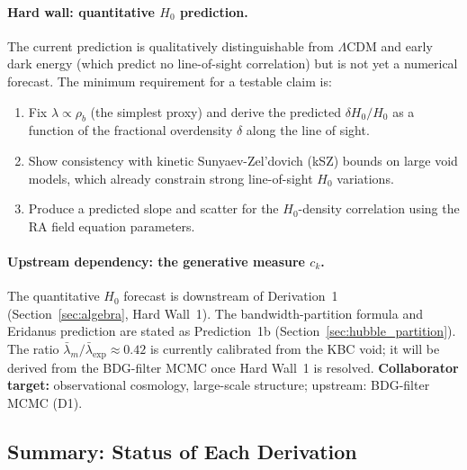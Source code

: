\documentclass[11pt,a4paper]{article}
\theoremstyle{plain}
\theoremstyle{definition}
\theoremstyle{remark}
\begin{document}
\paragraph{Hard wall: quantitative $H_0$ prediction.}
The current prediction is qualitatively distinguishable from $\Lambda$CDM and
early dark energy (which predict no line-of-sight correlation) but is not yet
a numerical forecast. The minimum requirement for a testable claim is:
\begin{enumerate}[noitemsep]
  \item Fix $\lambda \propto \rho_b$ (the simplest proxy) and derive the
  predicted $\delta H_0 / H_0$ as a function of the fractional overdensity
  $\delta$ along the line of sight.
  \item Show consistency with kinetic Sunyaev-Zel'dovich (kSZ) bounds on large
  void models, which already constrain strong line-of-sight $H_0$ variations.
  \item Produce a predicted slope and scatter for the $H_0$-density correlation
  using the RA field equation parameters.
\end{enumerate}

\paragraph{Upstream dependency: the generative measure $c_k$.}
The quantitative $H_0$ forecast is downstream of Derivation~1
(Section~\ref{sec:algebra}, Hard Wall~1). The bandwidth-partition formula
and Eridanus prediction are stated as Prediction~1b
(Section~\ref{sec:hubble_partition}). The ratio
$\bar\lambda_m/\bar\lambda_{\mathrm{exp}} \approx 0.42$ is currently calibrated
from the KBC void; it will be derived from the BDG-filter MCMC once Hard Wall~1
is resolved.
\textbf{Collaborator target:} observational cosmology, large-scale structure;
upstream: BDG-filter MCMC (D1).

\subsection{Summary: Status of Each Derivation}
\end{document}
